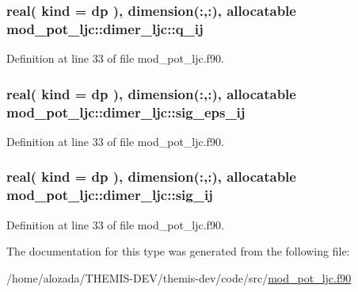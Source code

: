 \subsubsection[{\texorpdfstring{q\+\_\+ij}{q_ij}}]{\setlength{\rightskip}{0pt plus 5cm}real( kind = dp ), dimension(\+:,\+:), allocatable mod\+\_\+pot\+\_\+ljc\+::dimer\+\_\+ljc\+::q\+\_\+ij}\hypertarget{structmod__pot__ljc_1_1dimer__ljc_a92979f65abc0895fcaa532667db38fb6}{}\label{structmod__pot__ljc_1_1dimer__ljc_a92979f65abc0895fcaa532667db38fb6}


Definition at line 33 of file mod\+\_\+pot\+\_\+ljc.\+f90.

\subsubsection[{\texorpdfstring{sig\+\_\+eps\+\_\+ij}{sig_eps_ij}}]{\setlength{\rightskip}{0pt plus 5cm}real( kind = dp ), dimension(\+:,\+:), allocatable mod\+\_\+pot\+\_\+ljc\+::dimer\+\_\+ljc\+::sig\+\_\+eps\+\_\+ij}\hypertarget{structmod__pot__ljc_1_1dimer__ljc_aeecdcee92d0a969cf85874052a81872d}{}\label{structmod__pot__ljc_1_1dimer__ljc_aeecdcee92d0a969cf85874052a81872d}


Definition at line 33 of file mod\+\_\+pot\+\_\+ljc.\+f90.

\subsubsection[{\texorpdfstring{sig\+\_\+ij}{sig_ij}}]{\setlength{\rightskip}{0pt plus 5cm}real( kind = dp ), dimension(\+:,\+:), allocatable mod\+\_\+pot\+\_\+ljc\+::dimer\+\_\+ljc\+::sig\+\_\+ij}\hypertarget{structmod__pot__ljc_1_1dimer__ljc_acfee344761569c6861c21cb329e7a312}{}\label{structmod__pot__ljc_1_1dimer__ljc_acfee344761569c6861c21cb329e7a312}


Definition at line 33 of file mod\+\_\+pot\+\_\+ljc.\+f90.



The documentation for this type was generated from the following file\+:\begin{DoxyCompactItemize}
\item 
/home/alozada/\+T\+H\+E\+M\+I\+S-\/\+D\+E\+V/themis-\/dev/code/src/\hyperlink{mod__pot__ljc_8f90}{mod\+\_\+pot\+\_\+ljc.\+f90}\end{DoxyCompactItemize}
